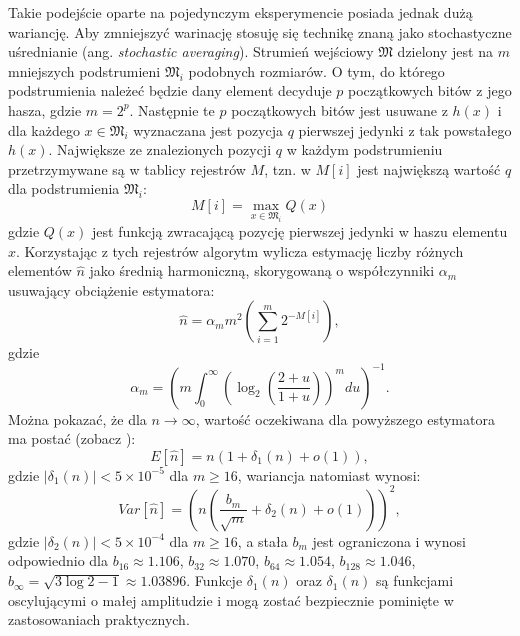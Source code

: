 Takie podejście oparte na pojedynczym eksperymencie posiada jednak dużą wariancję. Aby zmniejszyć warinację stosuję się technikę znaną jako stochastyczne uśrednianie (ang. \textit{stochastic averaging}). Strumień wejściowy $\mathfrak{M}$ dzielony jest na $m$ mniejszych podstrumieni $\mathfrak{M}_i$ podobnych rozmiarów. O tym, do którego podstrumienia należeć będzie dany element decyduje $p$ początkowych bitów z jego hasza, gdzie $m = 2^p$. Następnie te $p$ początkowych bitów jest usuwane z $h(x)$ i dla  każdego $x\in \mathfrak{M}_i$ wyznaczana jest pozycja $q$ pierwszej jedynki z tak powstałego $h(x)$. Największe ze znalezionych pozycji $q$ w każdym podstrumieniu przetrzymywane są w tablicy rejestrów $M$, tzn. w $M[i]$ jest największą  wartość $q$
dla  podstrumienia $\mathfrak{M}_i$:
\begin{equation}
    M[i] = \max_{x \in \mathfrak{M}_i} Q(x)
\end{equation}
gdzie $Q(x)$ jest funkcją zwracającą  pozycję pierwszej jedynki w haszu elementu $x$.
 Korzystając z tych rejestrów algorytm wylicza estymację liczby różnych elementów $\hat{n}$
 jako średnią harmoniczną, skorygowaną o współczynniki ${\alpha}_{m}$ usuwający obciążenie estymatora:
\begin{equation}
    \hat{n} = {\alpha}_m{m}^{2}(\sum_{i=1}^{m} 2^{-M[i]}),
\end{equation}
gdzie
\begin{equation}
    {\alpha}_{m} = (m \int_{0}^{\infty} ({\log}_2(\frac{2 + u}{1 + u}))^m du)^{-1}.
\end{equation}
Można pokazać, że dla  $n \rightarrow \infty$, wartość oczekiwana dla powyższego estymatora ma postać (zobacz \cite{hll}):
\begin{equation}
    E[\hat{n}] = n(1 + {\delta}_1(n) + o(1)),
\end{equation}
gdzie $|{\delta}_1(n)| < 5 \times 10^{-5}$ dla $m \geq 16$, wariancja natomiast wynosi:
\begin{equation}
    Var[\hat{n}] = (n(\frac{{b}_m}{\sqrt{m}} + {\delta}_2(n) + o(1)))^2,
\end{equation}
 gdzie $|{\delta}_2(n)| < 5 \times 10^{-4}$ dla $m \geq 16$, a stała ${b}_m$ jest ograniczona i wynosi odpowiednio dla ${b}_{16} \approx 1.106$, ${b}_{32} \approx 1.070$, ${b}_{64} \approx 1.054$, ${b}_{128} \approx 1.046$, ${b}_{\infty} = \sqrt{3\log{2} - 1} \approx 1.03896$. Funkcje ${\delta}_1(n)$ oraz ${\delta}_1(n)$ są funkcjami oscylującymi o małej amplitudzie i mogą zostać bezpiecznie pominięte w zastosowaniach praktycznych.

